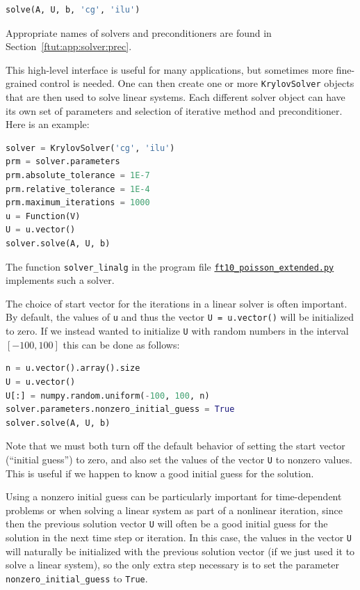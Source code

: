 \documentclass[graybox,envcountchap,sectrefs,final]{svmonodo}
\begin{document}
\begin{lstlisting}[language=Python,style=graycolor]
solve(A, U, b, 'cg', 'ilu')
\end{lstlisting}
Appropriate names of solvers and preconditioners are found in
Section~\ref{ftut:app:solver:prec}.


This high-level interface is useful for many applications, but
sometimes more fine-grained control is needed. One can then create one
or more \texttt{KrylovSolver} objects that are then used to solve linear
systems. Each different solver object can have its own set of
parameters and selection of iterative method and preconditioner. Here
is an example:

\begin{lstlisting}[language=Python,style=graycolor]
solver = KrylovSolver('cg', 'ilu')
prm = solver.parameters
prm.absolute_tolerance = 1E-7
prm.relative_tolerance = 1E-4
prm.maximum_iterations = 1000
u = Function(V)
U = u.vector()
solver.solve(A, U, b)
\end{lstlisting}
The function \Verb!solver_linalg! in the program file
\href{{https://fenicsproject.org/pub/tutorial/python/vol1/ft10_poisson_extended.py}}{\nolinkurl{ft10_poisson_extended.py}}
implements such a solver.

The choice of start vector for the iterations in a linear solver is
often important. By default, the values of \texttt{u} and thus the vector \texttt{U = u.vector()} will be initialized to zero. If we instead wanted to
initialize \texttt{U} with random numbers in the interval $[-100,100]$ this
can be done as follows:

\begin{lstlisting}[language=Python,style=graycolor]
n = u.vector().array().size
U = u.vector()
U[:] = numpy.random.uniform(-100, 100, n)
solver.parameters.nonzero_initial_guess = True
solver.solve(A, U, b)
\end{lstlisting}
Note that we must both turn off the default behavior of setting the start
vector (``initial guess'') to zero, and also set the values of the
vector \texttt{U} to nonzero values. This is useful if we happen to
know a good initial guess for the solution.

Using a nonzero initial guess can be particularly important for
time-dependent problems or when solving a linear system as part of a
nonlinear iteration, since then the previous solution vector \texttt{U} will
often be a good initial guess for the solution in the next time step
or iteration. In this case, the values in the vector \texttt{U} will
naturally be initialized with the previous solution vector (if we just
used it to solve a linear system), so the only extra step necessary is
to set the parameter \Verb!nonzero_initial_guess! to \texttt{True}.
\end{document}
